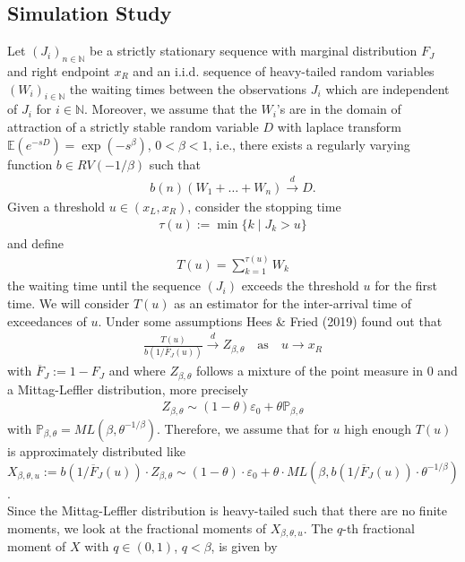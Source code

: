 \documentclass[10pt, a4paper]{article}\usepackage[]{graphicx}\usepackage[]{color}
\newcommand{\widebar}{\overline}
\begin{document}
	
	
	
\subsection*{Simulation Study}
Let $(J_i)_{n \in \mathbb{N}}$ be a strictly stationary sequence with marginal distribution $F_J$ and right endpoint $x_R$ and an i.i.d. sequence of heavy-tailed random variables $(W_i)_{i \in \mathbb{N}}$ the waiting times between the observations $J_i$ which are independent of $J_i$ for $i \in \mathbb{N}$. Moreover, we assume that the $W_i$'s are in the domain of attraction of a strictly stable random variable $D$ with laplace transform $\mathbb{E}(e^{-sD})=\exp(-s^{\beta})$, $0<\beta<1$, i.e., there exists a regularly varying function $b \in RV(-1/\beta)$ such that
\begin{align} \label{eq4}
b(n)(W_1+\dots+W_n) \overset{d}{\longrightarrow} D.
\end{align}
Given a threshold $u \in (x_L,x_R)$, consider the stopping time 
\begin{align}
	\tau(u):=\min\{k \mid J_k > u \}
\end{align}
and define 
\begin{align}
	T(u)=\sum_{k=1}^{\tau(u)} W_k
\end{align}
the waiting time until the sequence $(J_i)$ exceeds the threshold $u$ for the first time. We will consider $T(u)$ as an estimator for the inter-arrival time of exceedances of $u$.
Under some assumptions Hees \& Fried (2019) found out that 
\begin{align}
	\frac{T(u)}{b(1/\widebar{F}_J(u))} \overset{d}{\longrightarrow} Z_{\beta,\theta} \quad \text{as} \quad u \to x_R
\end{align}
with $\widebar{F}_J:=1-F_J$ and where $Z_{\beta,\theta}$ follows a mixture of the point measure in 0 and a Mittag-Leffler distribution, more precisely
\begin{align}
	Z_{\beta,\theta} \sim (1-\theta)\varepsilon_0+\theta\mathbb{P}_{\beta,\theta}
\end{align}
with $\mathbb{P}_{\beta,\theta}=ML(\beta,\theta^{-1/\beta})$.
Therefore, we assume that for $u$ high enough $T(u)$ is approximately distributed like $X_{\beta,\theta,u}:=b(1/\widebar{F}_J(u)) \cdot Z_{\beta,\theta} \sim (1-\theta)\cdot\varepsilon_0+\theta \cdot ML(\beta,b(1/\widebar{F}_J(u)) \cdot \theta^{-1/\beta})$.
\\
Since the Mittag-Leffler distribution is heavy-tailed such that there are no finite moments, we look at the fractional moments of $X_{\beta,\theta,u}$. The $q$-th fractional moment of $X$ with $q \in (0,1)$, $q<\beta$, is given by
\end{document}
